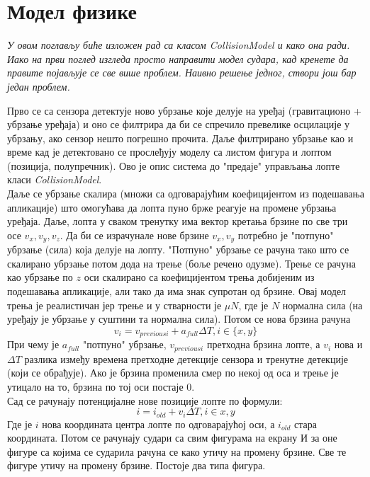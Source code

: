 \chapter{Модел физике} \label{Collision}
\emph{У овом поглављу биће изложен рад са класом CollisionModel и како она ради. Иако на први поглед изгледа просто направити модел судара, кад кренете да правите појављује се све више проблем. Наивно решење једног, створи још бар један проблем. }

Прво се са сензора детектује ново убрзање које делује на уређај (гравитационо + убрзање уређаја) и оно се филтрира да би се спречило превелике осцилације у убрзању, ако сензор нешто погрешно прочита. Даље филтрирано убрзање као и време кад је детектовано се прослеђују моделу са листом фигура и лоптом (позиција, полупречник). Ово је опис система до "предаје" управљања лопте класи \emph{CollisionModel}. 
\\ \indent 
Даље се убрзање скалира (множи са одговарајућим коефицијентом из подешавања апликације) што омогућава да лопта пуно брже реагује на промене убрзања уређаја. 
Даље, лопта у сваком тренутку има вектор кретања брзине по све три осе $v_x, v_y, v_z$. Да би се израчунале нове брзине $v_x, v_y$ потребно је "потпуно" убрзање (сила) која делује на лопту. "Потпуно" убрзање се рачуна тако што се скалирано убрзање потом дода на трење (боље речено одузме). Трење се рачуна као убрзање по $z$ оси скалирано са коефицијентом трења добијеним из подешавања апликације, али тако да има знак супротан од брзине. Овај модел трења је реалистичан јер трење и у стварности је $\mu N$, где је $N$ нормална сила (на уређају је убрзање у суштини та нормална сила). Потом се нова брзина рачуна 
$$v_i=v_{previousi} + a_{full}  \Delta T, i \in \{x, y\}$$
При чему је $a_{full}$ "потпуно" убрзање, $v_{previousi}$ претходна брзина лопте, а $v_i$ нова и $\Delta T$  разлика између времена претходне детекције сензора и тренутне детекције (који се обрађује). Ако је брзина променила смер по некој од оса и трење је утицало на то, брзина по тој оси постаје 0. 
\\ \indent
Сад се рачунају потенцијалне нове позиције лопте по формули:
$$i = i_{old} + v_i \Delta T, i\in{x, y}$$
Где је $i$ нова координата центра лопте по одговарајућој оси, а $i_{old}$ стара координата. Потом се рачунају судари са свим фигурама на екрану И за оне фигуре са којима се сударила рачуна се како утичу на промену брзине. Све те фигуре утичу на промену брзине.  Постоје два типа фигура. 
\\ \indent 
